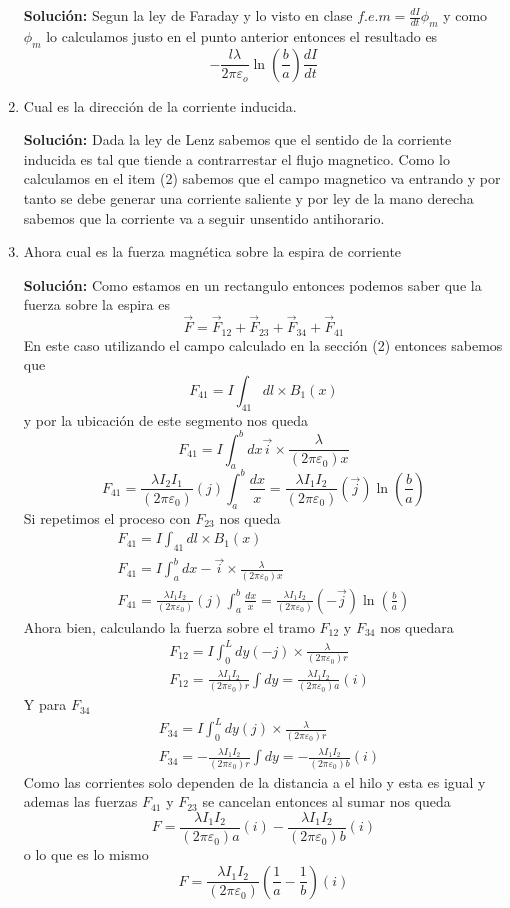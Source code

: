 \documentclass[12pt]{exam}
\begin{document}
\begin{enumerate}
    \textbf{Solución:} Segun la ley de Faraday y lo visto en clase $f.e.m = \frac{dI}{dt}\phi_m$ y como $\phi_m$ lo calculamos justo
    en el punto anterior entonces el resultado es $$-\frac{l\lambda}{2\pi\varepsilon_o}\ln{\left(\frac{b}{a}\right)}\frac{dI}{dt}$$
    \item Cual es la dirección de la corriente inducida. 
    
    \textbf{Solución:} Dada la ley de Lenz sabemos que el sentido de la corriente inducida es tal que tiende a contrarrestar
    el flujo magnetico. Como lo calculamos en el item (2) sabemos que el campo magnetico va entrando y por tanto se debe generar
    una corriente saliente y por ley de la mano derecha sabemos que la corriente va a seguir unsentido antihorario.
    \item Ahora cual es la fuerza magnética sobre la espira de corriente
    
    \textbf{Solución: } Como estamos en un rectangulo entonces podemos saber que la fuerza sobre la espira es 
    $$\vec{F} = \vec{F}_{12} + \vec{F}_{23} + \vec{F}_{34} + \vec{F}_{41}$$ En este caso utilizando el campo calculado en
    la sección (2) entonces sabemos que 
    $$F_{41} = I \int_{41} d l \times B_1(x)$$
    y por la ubicación de este segmento nos queda
    $$F_{41} = I \int_a^b dx \vec{i}\times \frac{\lambda}{(2\pi\varepsilon_0)x}$$
    $$F_{41} = \frac{\lambda I_2 I_1}{(2\pi\varepsilon_0)}(j)\int_a^b \frac{dx}{x} = \frac{\lambda I_1 I_2}{(2\pi\varepsilon_0)}(\vec{j})\ln(\frac{b}{a})$$
    Si repetimos el proceso con $F_{23}$ nos queda
    \begin{align*}
        F_{41} = I \int_{41} d l \times B_1(x)\\
        F_{41} = I \int_a^b dx -\vec{i}\times \frac{\lambda}{(2\pi\varepsilon_0)x}\\
        F_{41} = \frac{\lambda I_1 I_2}{(2\pi\varepsilon_0)}(j)\int_a^b \frac{dx}{x} = \frac{\lambda I_1 I_2}{(2\pi\varepsilon_0)}(-\vec{j})\ln(\frac{b}{a})
    \end{align*}
    Ahora bien, calculando la fuerza sobre el tramo $F_{12}$ y $F_{34}$ nos quedara
    \begin{align*}
        &F_{12} = I \int_0^L dy(-j)\times \frac{\lambda}{(2\pi\varepsilon_0)r}\\
        &F_{12} = \frac{\lambda I_1 I_2}{(2\pi\varepsilon_0)r} \int dy = \frac{\lambda I_1 I_2}{(2\pi\varepsilon_0)a} (i)
    \end{align*}
    Y para $F_{34}$
    \begin{align*}
        &F_{34} = I \int_0^L dy(j)\times \frac{\lambda}{(2\pi\varepsilon_0)r}\\
        &F_{34} = -\frac{\lambda I_1 I_2}{(2\pi\varepsilon_0)r} \int dy = -\frac{\lambda I_1 I_2}{(2\pi\varepsilon_0)b} (i)
    \end{align*}
    Como las corrientes solo dependen de la distancia a el hilo y esta es igual y ademas las fuerzas $F_{41}$ y $F_{23}$ se cancelan
    entonces al sumar nos queda $$F = \frac{\lambda I_1 I_2}{(2\pi\varepsilon_0)a} (i) -\frac{\lambda I_1 I_2}{(2\pi\varepsilon_0)b} (i)$$
    o lo que es lo mismo $$F = \frac{\lambda I_1 I_2}{(2\pi\varepsilon_0)}(\frac{1}{a}-\frac{1}{b})(i)$$
\end{enumerate}
\end{document}
